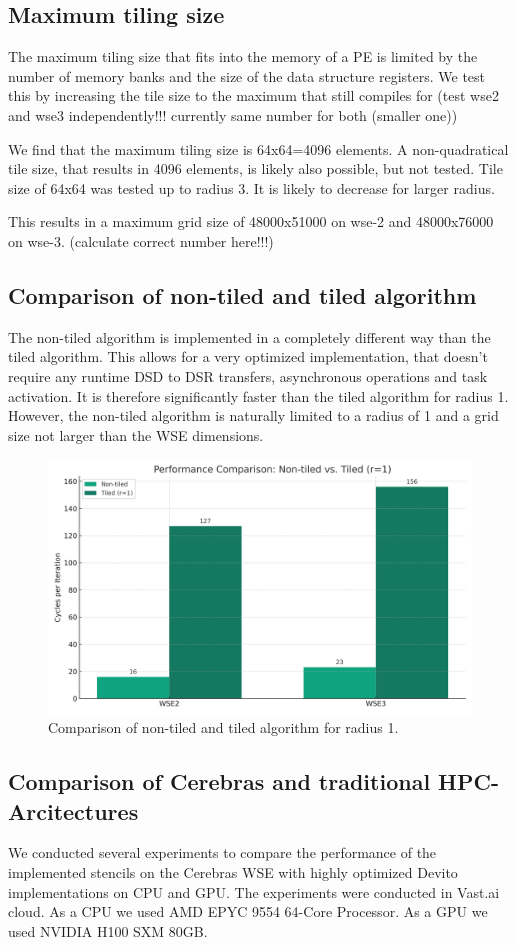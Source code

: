 \documentclass{article}
\begin{document}
\subsection{Maximum tiling size}
The maximum tiling size that fits into the memory of a PE is limited by the number of memory banks and the size of the data structure registers.
We test this by increasing the tile size to the maximum that still compiles for (test wse2 and wse3 independently!!! currently same number for both (smaller one))

We find that the maximum tiling size  is 64x64=4096 elements.
A non-quadratical tile size, that results in 4096 elements, is likely also possible, but not tested.
Tile size of 64x64 was tested up to radius 3. It is likely to decrease for larger radius.

This results in a maximum grid size of 48000x51000 on wse-2 and 48000x76000 on wse-3. (calculate correct number here!!!)

\subsection{Comparison of non-tiled and tiled algorithm}

The non-tiled algorithm is implemented in a completely different way than the tiled algorithm.
This allows for a very optimized implementation, that doesn't require any runtime DSD to DSR transfers, asynchronous operations and task activation.
It is therefore significantly faster than the tiled algorithm for radius 1.
However, the non-tiled algorithm is naturally limited to a radius of 1 and a grid size not larger than the WSE dimensions.

\begin{figure}[h]
    \centering
    \includegraphics[width=0.5\linewidth]{plots/algo_comparison.png}
    \caption{Comparison of non-tiled and tiled algorithm for radius 1.}
    \label{fig:algo_comparison}
\end{figure}


\subsection{Comparison of Cerebras and traditional HPC-Arcitectures}
We conducted several experiments to compare the performance of the implemented stencils on the Cerebras WSE with highly optimized Devito implementations on CPU and GPU. The experiments were conducted in Vast.ai cloud.
As a CPU we used AMD EPYC 9554 64-Core Processor.
As a GPU we used NVIDIA H100 SXM 80GB.
\end{document}
